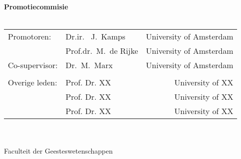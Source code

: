 {%
\clearpage
\noindent%
{\bf Promotiecommisie}\\
\\
\begin{tabular}[t]{@{}llr}
Promotoren:      
& Dr.ir. \ J.~Kamps  & University of Amsterdam \\  
& Prof.dr.\ M.~de Rijke  & University of Amsterdam \\  

Co-supervisor:   
& Dr.\ M.~Marx       & University of Amsterdam \\  %
\\
Overige leden: 
& Prof. Dr. XX    & University of XX \\ 
& Prof. Dr. XX    & University of XX \\ 
& Prof. Dr. XX    & University of XX \\ 
\end{tabular}\\
\\
Faculteit der Geesteswetenschappen \\ %
\clearpage
} %

